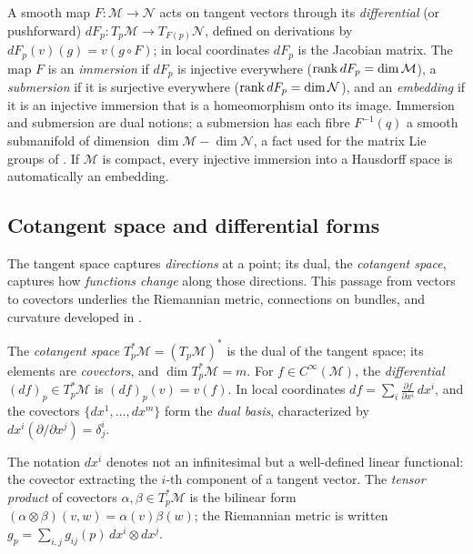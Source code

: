 A smooth map $F : \mathcal{M} \to \mathcal{N}$ acts on tangent vectors through its
\emph{differential} (or pushforward) $dF_p : T_p\mathcal{M} \to
T_{F(p)}\mathcal{N}$, defined on derivations by $dF_p(v)(g) = v(g\circ F)$; in
local coordinates $dF_p$ is the Jacobian matrix. The map $F$ is an
\emph{immersion} if $dF_p$ is injective everywhere
($\operatorname{rank} dF_p = \dim\mathcal{M}$), a \emph{submersion} if it is surjective
everywhere ($\operatorname{rank} dF_p = \dim\mathcal{N}$), and an \emph{embedding} if it is an
injective immersion that is a homeomorphism onto its image. Immersion and
submersion are dual notions; a submersion has each fibre $F^{-1}(q)$ a smooth
submanifold of dimension $\dim\mathcal{M} - \dim\mathcal{N}$, a fact used for the
matrix Lie groups of . If $\mathcal{M}$ is compact,
every injective immersion into a Hausdorff space is automatically an embedding.

\subsection{Cotangent space and differential forms}
\label{sec:found:cotangent}

The tangent space captures \emph{directions} at a point; its dual, the
\emph{cotangent space}, captures how \emph{functions change} along those
directions. This passage from vectors to covectors underlies the Riemannian
metric, connections on bundles, and curvature developed in
.

\begin{definition}
\label{def:found:cotangent}
The \emph{cotangent space} $T_p^*\mathcal{M} = (T_p\mathcal{M})^*$ is the dual of
the tangent space; its elements are \emph{covectors}, and $\dim T_p^*\mathcal{M}
= m$. For $f \in C^\infty(\mathcal{M})$, the \emph{differential} $(df)_p \in
T_p^*\mathcal{M}$ is $(df)_p(v) = v(f)$. In local coordinates $df = \sum_i
\frac{\partial f}{\partial x^i}\, dx^i$, and the covectors $\{dx^1, \ldots,
dx^m\}$ form the \emph{dual basis}, characterized by $dx^i(\partial/\partial
x^j) = \delta^i_j$.
\end{definition}

The notation $dx^i$ denotes not an infinitesimal but a well-defined linear
functional: the covector extracting the $i$-th component of a tangent vector. The
\emph{tensor product} of covectors $\alpha, \beta \in T_p^*\mathcal{M}$ is the
bilinear form $(\alpha \otimes \beta)(v, w) = \alpha(v)\beta(w)$; the Riemannian
metric is written $g_p = \sum_{i,j} g_{ij}(p)\, dx^i \otimes dx^j$.

